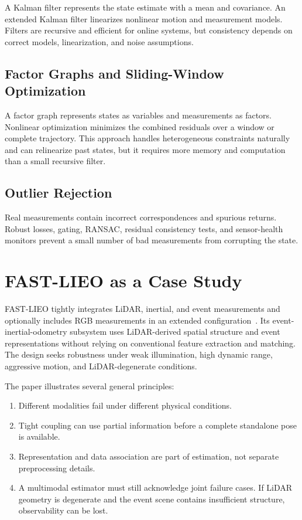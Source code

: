 A Kalman filter represents the state estimate with a mean and covariance. An extended Kalman filter linearizes nonlinear motion and measurement models. Filters are recursive and efficient for online systems, but consistency depends on correct models, linearization, and noise assumptions.

\subsection{Factor Graphs and Sliding-Window Optimization}

A factor graph represents states as variables and measurements as factors. Nonlinear optimization minimizes the combined residuals over a window or complete trajectory. This approach handles heterogeneous constraints naturally and can relinearize past states, but it requires more memory and computation than a small recursive filter.

\subsection{Outlier Rejection}

Real measurements contain incorrect correspondences and spurious returns. Robust losses, gating, RANSAC, residual consistency tests, and sensor-health monitors prevent a small number of bad measurements from corrupting the state.

\section{FAST-LIEO as a Case Study}

FAST-LIEO tightly integrates LiDAR, inertial, and event measurements and optionally includes RGB measurements in an extended configuration~\cite{wang2025fastlieo}. Its event-inertial-odometry subsystem uses LiDAR-derived spatial structure and event representations without relying on conventional feature extraction and matching. The design seeks robustness under weak illumination, high dynamic range, aggressive motion, and LiDAR-degenerate conditions.

The paper illustrates several general principles:

\begin{enumerate}[label=\arabic*.]
    \item Different modalities fail under different physical conditions.
    \item Tight coupling can use partial information before a complete standalone pose is available.
    \item Representation and data association are part of estimation, not separate preprocessing details.
    \item A multimodal estimator must still acknowledge joint failure cases. If LiDAR geometry is degenerate and the event scene contains insufficient structure, observability can be lost.
\end{enumerate}

